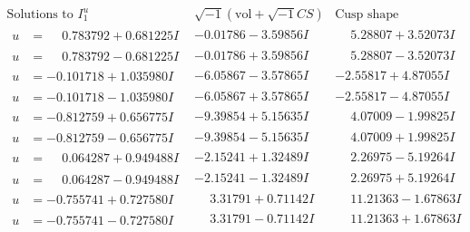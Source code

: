 \documentclass[1p]{elsarticle_modified}
\theoremstyle{definition}
\newcommand{\I}{\sqrt{-1}}
\begin{document}
$$\begin{array}{c|c|c}  
\text{Solutions to }I^u_{1}& \I (\text{vol} + \sqrt{-1}CS) & \text{Cusp shape}\\
 \hline 
\begin{aligned}
u &= \phantom{-}0.783792 + 0.681225 I\end{aligned}
 & -0.01786 - 3.59856 I & \phantom{-}5.28807 + 3.52073 I \\ \hline\begin{aligned}
u &= \phantom{-}0.783792 - 0.681225 I\end{aligned}
 & -0.01786 + 3.59856 I & \phantom{-}5.28807 - 3.52073 I \\ \hline\begin{aligned}
u &= -0.101718 + 1.035980 I\end{aligned}
 & -6.05867 - 3.57865 I & -2.55817 + 4.87055 I \\ \hline\begin{aligned}
u &= -0.101718 - 1.035980 I\end{aligned}
 & -6.05867 + 3.57865 I & -2.55817 - 4.87055 I \\ \hline\begin{aligned}
u &= -0.812759 + 0.656775 I\end{aligned}
 & -9.39854 + 5.15635 I & \phantom{-}4.07009 - 1.99825 I \\ \hline\begin{aligned}
u &= -0.812759 - 0.656775 I\end{aligned}
 & -9.39854 - 5.15635 I & \phantom{-}4.07009 + 1.99825 I \\ \hline\begin{aligned}
u &= \phantom{-}0.064287 + 0.949488 I\end{aligned}
 & -2.15241 + 1.32489 I & \phantom{-}2.26975 - 5.19264 I \\ \hline\begin{aligned}
u &= \phantom{-}0.064287 - 0.949488 I\end{aligned}
 & -2.15241 - 1.32489 I & \phantom{-}2.26975 + 5.19264 I \\ \hline\begin{aligned}
u &= -0.755741 + 0.727580 I\end{aligned}
 & \phantom{-}3.31791 + 0.71142 I & \phantom{-}11.21363 - 1.67863 I \\ \hline\begin{aligned}
u &= -0.755741 - 0.727580 I\end{aligned}
 & \phantom{-}3.31791 - 0.71142 I & \phantom{-}11.21363 + 1.67863 I \\ \hline\begin{aligned}

\end{aligned}
\end{array}$$
\end{document}

